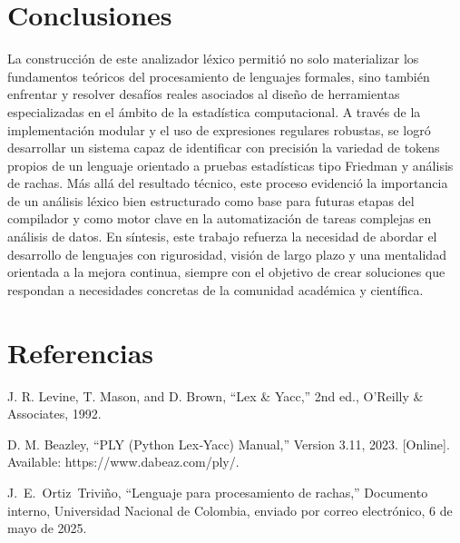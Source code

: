 \documentclass{article}
\begin{document}
\section{Conclusiones}

La construcción de este analizador léxico permitió no solo materializar 
los fundamentos teóricos del procesamiento de lenguajes formales, 
sino también enfrentar y resolver desafíos reales asociados al diseño de 
herramientas especializadas en el ámbito de la estadística computacional. 
A través de la implementación modular y el uso de expresiones regulares robustas, 
se logró desarrollar un sistema capaz de identificar con precisión la variedad 
de tokens propios de un lenguaje orientado a pruebas estadísticas tipo Friedman y 
análisis de rachas. Más allá del resultado técnico, este proceso evidenció la 
importancia de un análisis léxico bien estructurado como base para futuras etapas 
del compilador y como motor clave en la automatización de tareas complejas en 
análisis de datos. En síntesis, este trabajo refuerza la necesidad de abordar 
el desarrollo de lenguajes con rigurosidad, visión de largo plazo y una 
mentalidad orientada a la mejora continua, siempre con el objetivo de crear 
soluciones que respondan a necesidades concretas de la comunidad académica y 
científica.


\section{Referencias}
\renewcommand{\refname}{}

\begin{thebibliography}{9}


 \label{ref:lexPy1} J. R. Levine, T. Mason, and D. 
Brown, “Lex \& Yacc,” 2nd ed., O’Reilly \& Associates, 1992.

 \label{ref:lexPy2}  D. M. Beazley, “PLY (Python Lex‐Yacc)
Manual,” Version 3.11, 2023. [Online]. Available: https://www.dabeaz.com/ply/.

 \label{ref:rachas} J.~E.~Ortiz~Triviño, ``Lenguaje para 
  procesamiento de rachas,'' Documento interno, Universidad Nacional de 
    Colombia, enviado por correo electrónico, 6 de mayo de 2025.

\end{thebibliography}
\end{document}
